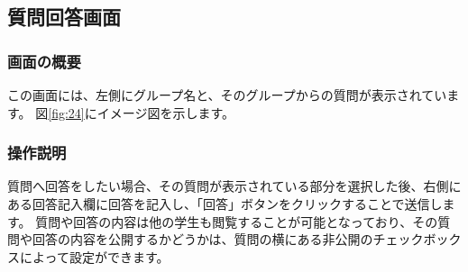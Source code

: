 \newpage

\subsection{質問回答画面}
\subsubsection{画面の概要}
この画面には、左側にグループ名と、そのグループからの質問が表示されています。
図\ref{fig:24}にイメージ図を示します。

\subsubsection{操作説明}
質問へ回答をしたい場合、その質問が表示されている部分を選択した後、右側にある回答記入欄に回答を記入し、「回答」ボタンをクリックすることで送信します。
質問や回答の内容は他の学生も閲覧することが可能となっており、その質問や回答の内容を公開するかどうかは、質問の横にある非公開のチェックボックスによって設定ができます。



